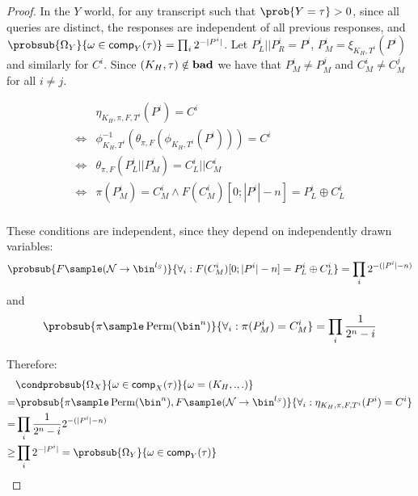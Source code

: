 \documentclass[eprint.tex]{subfiles}
\begin{document}
\begin{proof}
    In the $Y$ world, for any transcript such that $\prob{Y = \tau} > 0$,
    since all queries are distinct, the responses are independent of all
    previous responses, and
    $\probsub{\Omega_Y}{\omega \in \comp_Y(\tau)} = \prod_i 2^{-|P^i|}$.
    Let $P_L^i || P_R^i = P^i$, $P_M^i = \xi_{K_H, T^i}(P^i)$ and similarly for $C^i$.
    Since $(K_H, \tau) \notin \operatorname{\mathbf{bad}}$ we have that $P_M^i \neq P_M^j$
    and $C_M^i \neq C_M^j$ for all $i \neq j$.

    \begin{align*}
        & \eta_{K_H, \pi, F, T^i}(P^i) = C^i\\
        \Leftrightarrow & \phi_{K_H,T^i}^{-1}(\theta_{\pi, F}(\phi_{K_H,T^i}(P^i))) = C^i\\
        \Leftrightarrow & \theta_{\pi, F}(P_L^i || P_M^i) = C_L^i || C_M^i \\
        \Leftrightarrow & \pi(P_M^i) = C_M^i \wedge F(C_M^i)[0;|P^i| - n] = P_L^i \oplus C_L^i \\
    \end{align*}

    These conditions are independent, since they depend on independently drawn
    variables:
    \begin{displaymath}
        \probsub{
            F \sample (\mathcal{N} \rightarrow \bin^{l_S})
        }{
            \forall_i : F(C_M^i)[0;|P^i| - n] = P_L^i \oplus C_L^i
        } = \prod_i 2^{-(|P^i| - n)}
    \end{displaymath}
    and
    \begin{displaymath}
        \probsub{
            \pi \sample \Perm(\bin^n)
        }{
            \forall_i : \pi(P_M^i) = C_M^i
        } = \prod_i \frac{1}{2^n - i}
    \end{displaymath}

    Therefore:
    \begin{align*}
        &\condprobsub{\Omega_X}{\omega \in \comp_X(\tau)}{\omega = (K_H, ., .)} \\
        =& \probsub{
            \pi \sample \Perm(\bin^n),
            F \sample (\mathcal{N} \rightarrow \bin^{l_S})
        }{
            \forall_i : \eta_{K_H, \pi, F, T^i}(P^i) = C^i
        } \\
        =& \prod_i \frac{1}{2^n - i}2^{-(|P^i| - n)} \\
        \geq & \prod_i 2^{-|P^i|} = \probsub{\Omega_Y}{\omega \in \comp_Y(\tau)}\\
    \end{align*}
\end{proof}
\end{document}
